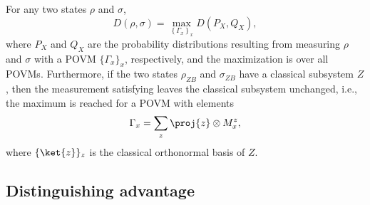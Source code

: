 \begin{lem}
  \label{lem:op.definitions.opt}
  For any two states $\rho$ and $\sigma$,
  \begin{equation} \label{eq:op.definitions.opt} D(\rho,\sigma) =
    \max_{\left\{\Gamma_x\right\}_x} D(P_X,Q_X),\end{equation}
  where $P_X$ and $Q_X$ are the probability distributions resulting
  from measuring $\rho$ and $\sigma$ with a POVM $\{\Gamma_x\}_x$,
  respectively, and the maximization is over all POVMs. Furthermore,
  if the two states $\rho_{ZB}$ and $\sigma_{ZB}$ have a classical
  subsystem $Z$, then the measurement satisfying
   leaves the classical subsystem
  unchanged, i.e., the maximum is reached for a POVM with
  elements \begin{equation} \label{eq:op.definitions.opt.classical}
    \Gamma_x = \sum_z \proj{z} \otimes M^z_x ,\end{equation} where
  $\{\ket{z}\}_z$ is the classical orthonormal basis of $Z$.
\end{lem}



\subsection{Distinguishing advantage}
\label{app:op.distadv}

